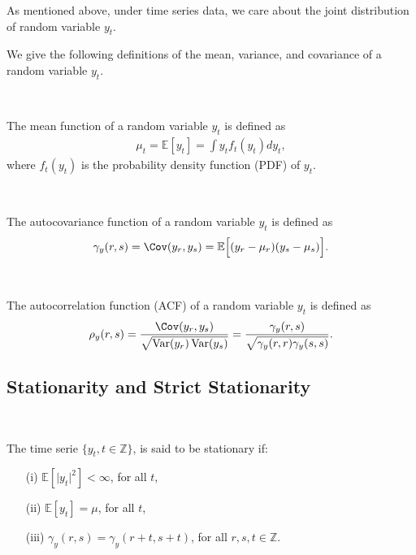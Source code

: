 As mentioned above, under time series data, we care about the joint distribution of random variable $y_t$.

We give the following definitions of the mean, variance, and covariance of a random variable $y_t$.
\begin{definition}\label{def:mean-function}
    \

    The mean function of a random variable $y_t$ is defined as
    \begin{gather*}
        \mu_t = \mathbb{E}[y_t] = \int y_t f_{t}(y_t) d y_t,
    \end{gather*}
    where $f_{t}(y_t)$ is the probability density function (PDF) of $y_t$.
\end{definition}

\begin{definition}\label{def:autocovariance-function}
    \

    The autocovariance function of a random variable $y_t$ is defined as
    \begin{gather*}
        \gamma_{y}(r,s) = \Cov(y_r, y_s) = \mathbb{E}\Bigl[ (y_r - \mu_r)(y_s - \mu_s) \Bigr].
    \end{gather*}    
\end{definition}

\begin{definition}\label{def:autocorrelation-function}
    \

    The autocorrelation function (ACF) of a random variable $y_t$ is defined as
    \begin{gather*}
        \rho_{y}(r,s) = \frac{\Cov(y_r, y_s)}{\sqrt{\operatorname{Var}(y_r) \operatorname{Var}(y_s)}} = \frac{\gamma_{y}(r,s)}{\sqrt{\gamma_{y}(r,r) \gamma_{y}(s,s)}}.
    \end{gather*}
    
\end{definition}

\subsection{Stationarity and Strict Stationarity}

\begin{definition}[Stationarity]\label{def:weak-stationarity}
    \

    The time serie $\{y_t, t \in \mathbb{Z}\}$, is said to be stationary if:
    \begin{enumerate}
        \item[(i)] $\mathbb{E}[\vert y_t \vert ^2] < \infty$, for all $t$,
        \item[(ii)] $\mathbb{E}[y_t] = \mu $, for all $t$,
        \item[(iii)] $\gamma_y(r,s) = \gamma_y(r+t, s+t)$, for all $r,s,t \in \mathbb{Z}$. 
    \end{enumerate}
\end{definition}

